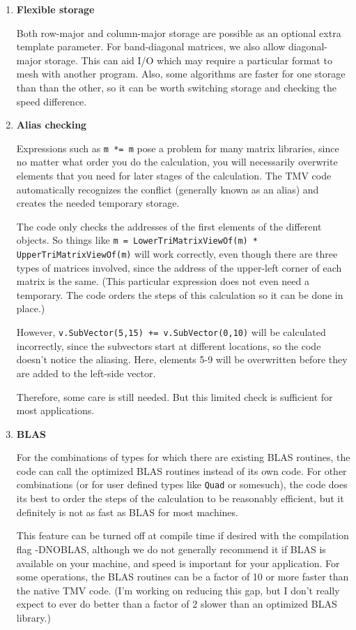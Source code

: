 \documentclass[twoside,letterpaper,11pt]{article}
\renewcommand{\tt}[1]{{\texttt {#1}}}
\begin{document}
\begin{enumerate}
\item
\textbf{Flexible storage}

Both row-major and column-major storage are possible as an optional
extra template parameter.
For band-diagonal matrices, we also allow diagonal-major storage.
This can aid I/O which may require a particular format to mesh with another
program.  Also, some algorithms 
are faster for one storage than than the other, so it can be worth switching storage
and checking the speed difference.

\item
\textbf{Alias checking}

Expressions such as \tt{m *= m} pose a problem for many matrix libraries, since
no matter what order you do the calculation, you will necessarily overwrite elements 
that you need for later stages of the calculation.  
The TMV code automatically recognizes the
conflict (generally known as an alias) and creates the needed temporary storage.

The code only checks the addresses of the first elements of the different objects.
So things like \tt{m = LowerTriMatrixViewOf(m) * UpperTriMatrixViewOf(m)} will work
correctly, even though there are three types of matrices involved, since the 
address of the upper-left corner of each matrix is the same.  (This particular
expression does not even need a temporary.  The code orders the steps of this
calculation so it can be done in place.)

However, \tt{v.SubVector(5,15) += v.SubVector(0,10)} will be calculated 
incorrectly, since the subvectors start at different locations, so the code
doesn't notice the aliasing.  Here, elements 5-9 will be overwritten before
they are added to the left-side vector.

Therefore, some care is still needed.  But this limited check is sufficient
for most applications.

\item
\textbf{BLAS}

For the combinations of types for which there are existing BLAS
routines, the code can call the optimized BLAS routines instead of its own 
code.  For other combinations (or for user defined types like 
\tt{Quad} or somesuch), 
the code does its best to order the steps of the calculation to be 
reasonably efficient, but it definitely is not as fast as BLAS for
most machines.

This feature can be turned off at compile time if desired with the 
compilation flag -DNOBLAS, although we do not generally recommend it if 
BLAS is available on your machine, and speed is important for your 
application.  For some operations, the BLAS routines can be a factor of 
10 or more faster than the native TMV code.  (I'm working on reducing this
gap, but I don't really expect to ever do better than a factor of 2 slower
than an optimized BLAS library.)


\end{enumerate}
\end{document}
